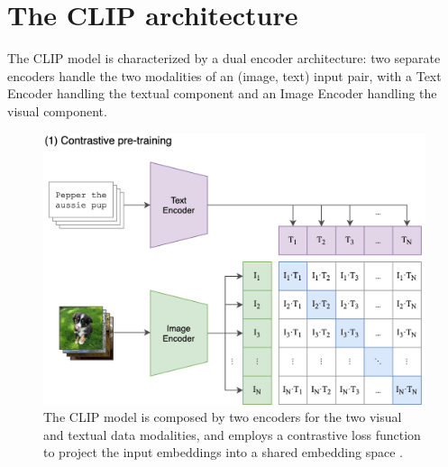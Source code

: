 \documentclass[a4paper, oneside, english]{sapthesis}
\begin{document}
\section{The CLIP architecture}

The CLIP model is characterized by a dual encoder architecture: two separate encoders handle the two modalities of an (image, text) input pair, with a Text Encoder handling the textual component and an Image Encoder handling the visual component.

\begin{figure}[h]
    \centering
    \includegraphics[width=\textwidth]{img/CLIP-structure.png}
    \caption{The CLIP model is composed by two encoders for the two visual and textual data modalities, and employs a contrastive loss function to project the input embeddings into a shared embedding space \cite{radford2021learning}.}
    \label{fig:clip}
\end{figure}
\end{document}
